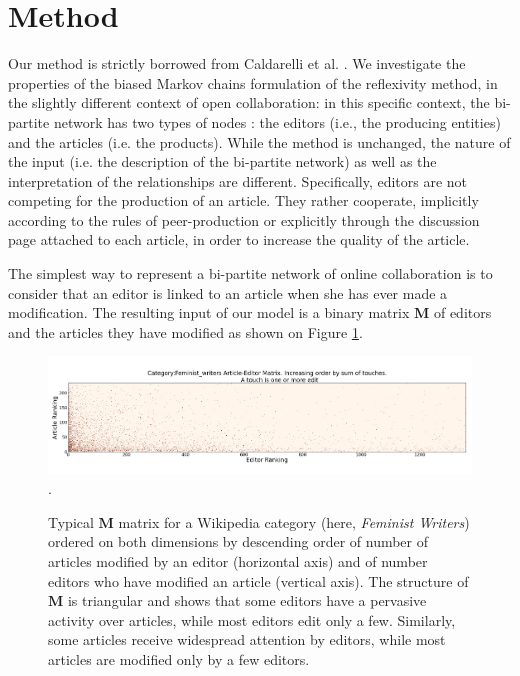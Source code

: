 \section{Method}
Our method is strictly borrowed from Caldarelli et al. \cite{caldarelli2012network}. We investigate the properties of the biased Markov chains formulation of the reflexivity method, in the slightly different context of open collaboration: in this specific context, the bi-partite network has two types of nodes : the editors (i.e., the producing entities) and the articles (i.e. the products). While the method is unchanged, the nature of the input (i.e. the description of the bi-partite network) as well as the interpretation of the relationships are different. Specifically, editors are not competing for the production of an article. They rather cooperate, implicitly according to the rules of peer-production or explicitly through the discussion page attached to each article, in order to increase the quality of the article.

The simplest way to represent a bi-partite network of online collaboration is to consider that an editor is linked to an article when she has ever made a modification. The resulting input of our model is a binary matrix $\mathbf{M}$ of editors and the articles they have modified as shown on Figure \ref{fig:matrix}. 

\begin{figure}[!t]
\centering
\includegraphics[width=2.0\columnwidth]{Figures/Category_Feminist_writerstriangle_matrix_corrected.png}.
\caption{Typical $\mathbf{M}$ matrix for a Wikipedia category (here, {\it Feminist Writers}) ordered on both dimensions by descending order of number of articles modified by an editor (horizontal axis) and of number editors who have modified an article (vertical axis). The structure of $\mathbf{M}$ is triangular and shows that some editors have a pervasive activity over articles, while most editors edit only a few. Similarly, some articles receive widespread attention by editors, while most articles are modified only by a few editors.}
\label{fig:matrix}
\end{figure}

